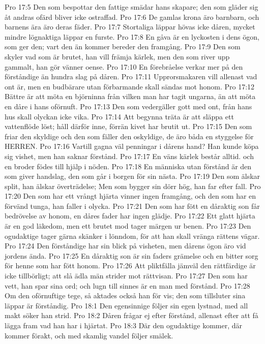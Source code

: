 Pro 17:5  Den som bespottar den fattige smädar hans skapare; den som gläder sig åt andras ofärd bliver icke ostraffad.
Pro 17:6  De gamlas krona äro barnbarn, och barnens ära äro deras fäder.
Pro 17:7  Stortaliga läppar hövas icke dåren, mycket mindre lögnaktiga läppar en furste.
Pro 17:8  En gåva är en lyckosten i dens ögon, som ger den; vart den än kommer bereder den framgång.
Pro 17:9  Den som skyler vad som är brutet, han vill främja kärlek, men den som river upp gammalt, han gör vänner oense.
Pro 17:10  En förebråelse verkar mer på den förståndige än hundra slag på dåren.
Pro 17:11  Upprorsmakaren vill allenast vad ont är, men en budbärare utan förbarmande skall sändas mot honom.
Pro 17:12  Bättre är att möta en björninna från vilken man har tagit ungarna, än att möta en dåre i hans oförnuft.
Pro 17:13  Den som vedergäller gott med ont, från hans hus skall olyckan icke vika.
Pro 17:14  Att begynna träta är att släppa ett vattenflöde löst; håll därför inne, förrän kivet har brutit ut.
Pro 17:15  Den som friar den skyldige och den som fäller den oskyldige, de äro båda en styggelse för HERREN.
Pro 17:16  Vartill gagna väl penningar i dårens hand? Han kunde köpa sig vishet, men han saknar förstånd.
Pro 17:17  En väns kärlek består alltid. och en broder födes till hjälp i nöden.
Pro 17:18  En människa utan förstånd är den som giver handslag, den som går i borgen för sin nästa.
Pro 17:19  Den som älskar split, han älskar överträdelse; Men som bygger sin dörr hög, han far efter fall.
Pro 17:20  Den som har ett vrångt hjärta vinner ingen framgång, och den som har en förvänd tunga, han faller i olycka.
Pro 17:21  Den som har fött en dåraktig son får bedrövelse av honom, en dåres fader har ingen glädje.
Pro 17:22  Ett glatt hjärta är en god läkedom, men ett brutet mod tager märgen ur benen.
Pro 17:23  Den ogudaktige tager gärna skänker i lönndom, för att han skall vränga rättens vägar.
Pro 17:24  Den förståndige har sin blick på visheten, men dårens ögon äro vid jordens ända.
Pro 17:25  En dåraktig son är sin faders grämelse och en bitter sorg för henne som har fött honom.
Pro 17:26  Att pliktfälla jämväl den rättfärdige är icke tillbörligt; att slå ädla män strider mot rättvisan.
Pro 17:27  Den som har vett, han spar sina ord; och lugn till sinnes är en man med förstånd.
Pro 17:28  Om den oförnuftige tege, så aktades också han för vis; den som tillsluter sina läppar är förståndig.
Pro 18:1  Den egensinnige följer sin egen lystnad, med all makt söker han strid.
Pro 18:2  Dåren frågar ej efter förstånd, allenast efter att få lägga fram vad han har i hjärtat.
Pro 18:3  Där den ogudaktige kommer, där kommer förakt, och med skamlig vandel följer smälek.
